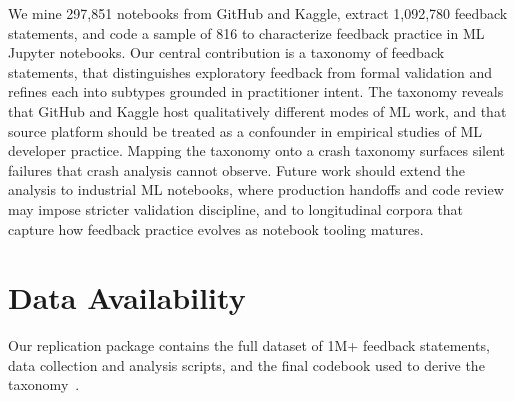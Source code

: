 \documentclass[a4paper,USenglish,cleveref,autoref,thm-restate,anonymous]{lipics-v2021}       %
\begin{document}
We mine 297,851 notebooks from GitHub and Kaggle,
extract 1,092,780 feedback statements,
and code a sample of 816
to characterize feedback practice in ML Jupyter notebooks.
Our central contribution is a taxonomy of feedback statements,
that distinguishes exploratory feedback from formal validation
and refines each into subtypes grounded in practitioner intent.
The taxonomy reveals that GitHub and Kaggle host qualitatively different modes of ML work,
and that source platform should be treated as a confounder
in empirical studies of ML developer practice.
Mapping the taxonomy onto a crash taxonomy
surfaces silent failures
that crash analysis cannot observe.
Future work should extend the analysis to industrial ML notebooks,
where production handoffs and code review
may impose stricter validation discipline,
and to longitudinal corpora
that capture how feedback practice evolves as notebook tooling matures.

\section{Data Availability}

Our replication package contains
the full dataset of 1M+ feedback statements,
data collection and analysis scripts,
and the final codebook used to derive the taxonomy~\cite{replication}.


\end{document}
